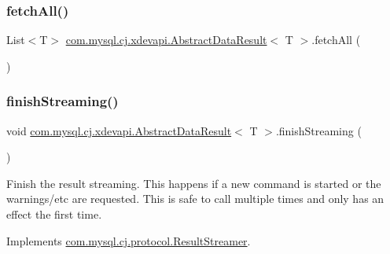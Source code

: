 \subsubsection{\texorpdfstring{fetch\+All()}{fetchAll()}}
{\footnotesize\ttfamily List$<$T$>$ \mbox{\hyperlink{classcom_1_1mysql_1_1cj_1_1xdevapi_1_1_abstract_data_result}{com.\+mysql.\+cj.\+xdevapi.\+Abstract\+Data\+Result}}$<$ T $>$.fetch\+All (\begin{DoxyParamCaption}{ }\end{DoxyParamCaption})}

\mbox{\label{classcom_1_1mysql_1_1cj_1_1xdevapi_1_1_abstract_data_result_a6a37bb1022bc6bea43edf1f996dca4d4}} 
\subsubsection{\texorpdfstring{finish\+Streaming()}{finishStreaming()}}
{\footnotesize\ttfamily void \mbox{\hyperlink{classcom_1_1mysql_1_1cj_1_1xdevapi_1_1_abstract_data_result}{com.\+mysql.\+cj.\+xdevapi.\+Abstract\+Data\+Result}}$<$ T $>$.finish\+Streaming (\begin{DoxyParamCaption}{ }\end{DoxyParamCaption})}

Finish the result streaming. This happens if a new command is started or the warnings/etc are requested. This is safe to call multiple times and only has an effect the first time. 

Implements \mbox{\hyperlink{interfacecom_1_1mysql_1_1cj_1_1protocol_1_1_result_streamer_a58007e9c29f81c5e681f3df64fc4a055}{com.\+mysql.\+cj.\+protocol.\+Result\+Streamer}}.

\mbox{\label{classcom_1_1mysql_1_1cj_1_1xdevapi_1_1_abstract_data_result_ab2e2a86090761e83b3198b2581a31d69}} 

